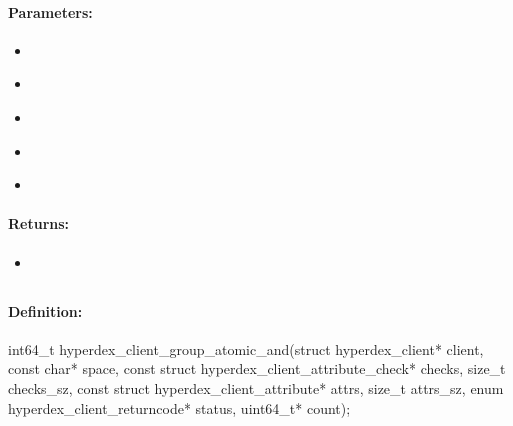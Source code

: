 \paragraph{Parameters:}
\begin{itemize}[noitemsep]
\item {}\\

\item {}\\

\item {}\\

\item {}\\

\item {}\\

\end{itemize}

\paragraph{Returns:}
\begin{itemize}[noitemsep]
\item {}\\

\end{itemize}

\pagebreak
\subsection{}
\label{api:c:group_atomic_and}


\paragraph{Definition:}
\begin{ccode}
int64_t hyperdex_client_group_atomic_and(struct hyperdex_client* client,
        const char* space,
        const struct hyperdex_client_attribute_check* checks, size_t checks_sz,
        const struct hyperdex_client_attribute* attrs, size_t attrs_sz,
        enum hyperdex_client_returncode* status,
        uint64_t* count);
\end{ccode}

